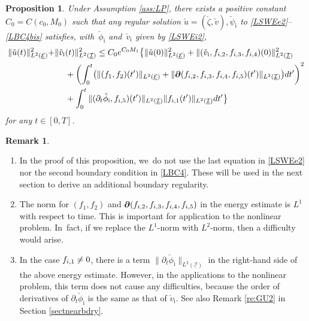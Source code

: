 \documentclass[11pt]{article}
\newcommand{\skpt}{\smallskip}
\newenvironment{enumeratei}
{\bgroup\def\theenumi{\roman{enumi}}\def\theenumii{\arabic{enumii}}\begin{enumerate}}
{\end{enumerate}\egroup}
\newcommand{\dt}{\partial_t}
\newcommand{\cI}{{\mathcal I}}
\newcommand{\cE}{{\mathcal E}}
\newcommand{\ul}[1]{\underline{#1}}
\newtheorem{proposition}[theorem]{Proposition}
\theoremstyle{definition}
\newtheorem{remark}[theorem]{Remark}
\begin{document}
\begin{proposition}\label{prop:BEE}
Under Assumption \ref{ass:LP}, there exists a positive constant $C_0=C(c_0,M_0)$ such that any regular solution
$\check{u}=(\check{\zeta},\check{v}), \check{\psi}_\mathrm{i}$ to \eqref{LSWEe2}--\eqref{LBC4bis} satisfies,
with~$\check{\phi}_\mathrm{i}$ and~$\check{v}_\mathrm{i}$ given by \eqref{LSWEi2},
\begin{align*}
\|\check{u}(t)\|_{L^2(\ul{\cE})}^2 +& \|\check{v}_\mathrm{i}(t)\|_{L^2(\ul{\cI})}^2
\leq C_0 e^{C_0M_1}\bigl\{ \|\check{u}(0)\|_{L^2(\ul{\cE})}^2 + \|(\check{v}_\mathrm{i},f_{{\rm i},2},f_{{\rm i},3},f_{{\rm i},4})(0)\|_{L^2(\ul{\cI})}^2 \\
&\quad\;
+ \left(\int_0^t \bigl(\|(f_1,f_2)(t')\|_{L^2(\ul{\cE})}
+ \|\bm{\partial}(f_{{\rm i},2},f_{{\rm i},3},f_{{\rm i},4},f_{{\rm i},5})(t')\|_{L^2(\ul{\cI})} \bigr){\rm d}t' \right)^2\\
&\quad\;
+ \int_0^t\|(\dt\check{\phi}_\mathrm{i},f_{i,5})(t')\|_{L^2(\ul{\cI})}\|f_{{\rm i},1}(t')\|_{L^2(\ul{\cI})}{\rm d}t' \bigr\}
\end{align*}
for any $t\in[0,T]$.
\end{proposition}

\skpt
\begin{remark}
\begin{enumeratei}
\item
In the proof of this proposition, we~do not use the last equation in \eqref{LSWEe2} nor the second boundary condition in \eqref{LBC4}.
These will be used in the next section to derive an additional boundary regularity.

\item
The norm for $(f_1,f_2)$ and $\bm{\partial}(f_{{\rm i},2},f_{{\rm i},3},f_{{\rm i},4},f_{{\rm i},5})$ in the energy estimate is $L^1$ with respect to time.
This is important for application to the nonlinear problem. In~fact, if we replace the $L^1$-norm with $L^2$-norm, then a difficulty would arise.

\item
In the case $f_{{\rm i},1}\ne0$, there is a term $\|\dt\check{\phi}_\mathrm{i}\|_{L^2(\ul{\cI})}$ in the right-hand side of the above energy estimate.
However, in the applications to the nonlinear problem, this term does not cause any difficulties,
because the order of derivatives of $\dt\check{\phi}_\mathrm{i}$ is the same as that of $\check{v}_\mathrm{i}$.
See also Remark \ref{re:GU2} in Section \ref{sectnearbdry}.
\end{enumeratei}
\end{remark}
\end{document}
